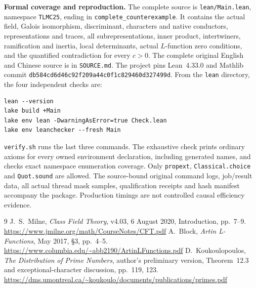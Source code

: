 \documentclass[10pt,a4paper]{article}
\begin{document}
\textbf{Formal coverage and reproduction.}
The complete source is \texttt{lean/Main.lean}, namespace \texttt{TLMC25},
ending in \texttt{complete\_counterexample}. It contains the actual field,
Galois isomorphism, discriminant, characters and native conductors,
representations and traces, all subrepresentations, inner product,
intertwiners, ramification and inertia, local determinants, actual
$L$-function zero conditions, and the quantified contradiction for every
$c>0$. The complete original English and Chinese source is in
\texttt{SOURCE.md}. The project pins Lean~4.33.0 and Mathlib commit
\texttt{db584cd6d46c92f209a44c0f1c829460d327499d}.
From the \texttt{lean} directory, the four independent checks are:
\begin{verbatim}
lean --version
lake build +Main
lake env lean -DwarningAsError=true Check.lean
lake env leanchecker --fresh Main
\end{verbatim}
\texttt{verify.sh} runs the last three commands. The exhaustive check prints
ordinary axioms for every owned environment declaration, including generated
names, and checks exact namespace enumeration coverage. Only
\texttt{propext}, \texttt{Classical.choice} and \texttt{Quot.sound} are allowed.
The source-bound original command logs, job/result data, all actual thread
mask samples, qualification receipts and hash manifest accompany the package.
Production timings are not controlled causal efficiency evidence.

\begin{thebibliography}{9}\small
{} J.~S.~Milne, \emph{Class Field Theory}, v4.03,
6 August 2020, Introduction, pp.~7--9.
\url{https://www.jmilne.org/math/CourseNotes/CFT.pdf}
 A.~Block, \emph{Artin L-Functions}, May 2017,
\S3, pp.~4--5.
\url{https://www.columbia.edu/~abb2190/ArtinLFunctions.pdf}
 D.~Koukoulopoulos, \emph{The Distribution of Prime Numbers},
author's preliminary version, Theorem~12.3 and exceptional-character discussion,
pp.~119, 123.
\url{https://dms.umontreal.ca/~koukoulo/documents/publications/primes.pdf}
\end{thebibliography}
\end{document}
